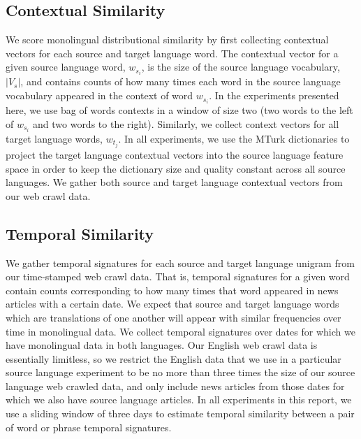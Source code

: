 \documentclass[11pt]{article}
\begin{document}
\subsection{Contextual Similarity} 
We score monolingual distributional similarity by first collecting contextual vectors for each source and target language word. The contextual vector for a given source language word, $w_{s_i}$, is the size of the source language vocabulary, $|V_s|$, and contains counts of how many times each word in the source language vocabulary appeared in the context of word $w_{s_i}$. In the experiments presented here, we use bag of words contexts in a window of size two (two words to the left of $w_{s_i}$ and two words to the right). Similarly, we collect context vectors for all target language words, $w_{t_j}$. In all experiments, we use the MTurk dictionaries to project the target language contextual vectors into the source language feature space in order to keep the dictionary size and quality constant across all source languages. 
We gather both source and target language contextual vectors from our web crawl data.

\subsection{Temporal Similarity}\label{ssec:temporal}
We gather temporal signatures for each source and target language unigram from our time-stamped web crawl data. That is, temporal signatures for a given word contain counts corresponding to how many times that word appeared in news articles with a certain date. We expect that source and target language words which are translations of one another will appear with similar frequencies over time in monolingual data. We collect temporal signatures over dates for which we have monolingual data in both languages. Our English web crawl data is essentially limitless, so we restrict the English data that we use in a particular source language experiment to be no more than three times the size of our source language web crawled data, and only include news articles from those dates for which we also have source language articles. In all experiments in this report, we use a sliding window of three days to estimate temporal similarity between a pair of word or phrase temporal signatures.
\end{document}
